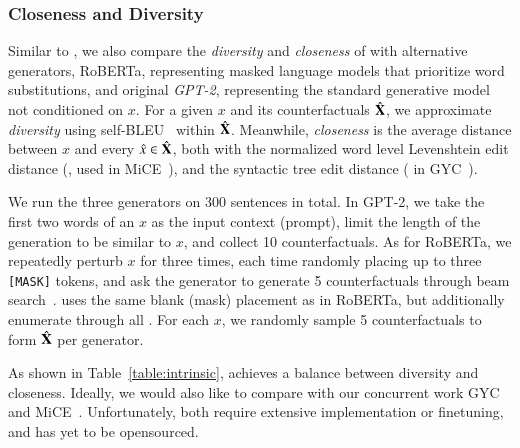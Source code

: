 \subsubsection{Closeness and Diversity}
Similar to \citet{madaan2020generate}, we also compare the \emph{diversity} and \emph{closeness} of \sysname with alternative generators, \ie RoBERTa, representing masked language models that prioritize word substitutions, and original \emph{GPT-2}, representing the standard generative model not conditioned on $x$. 
For a given $x$ and its counterfactuals $\hat{\mathbf{X}}$, we approximate \emph{diversity} using self-BLEU~\cite{zhu2018texygen} within $\hat{\mathbf{X}}$.
Meanwhile, \emph{closeness} is the average distance between $x$ and every $\hat{x} \in \hat{\mathbf{X}}$, both with the normalized word level Levenshtein edit distance (\cite{levenshtein1966binary}, used in MiCE~\cite{ross2020explaining}), and the syntactic tree edit distance (\cite{zhang1989simple} in GYC~\cite{madaan2020generate}).

We run the three generators on 300 sentences in total.
In GPT-2, we take the first two words of an $x$ as the input context (prompt), limit the length of the generation to be similar to $x$, and collect 10 counterfactuals.
As for RoBERTa, we repeatedly perturb $x$ for three times, each time randomly placing up to three \texttt{[MASK]} tokens, and ask the generator to generate 5 counterfactuals through beam search~\cite{checklist:acl20}.
\sysname uses the same blank (mask) placement as in RoBERTa, but additionally enumerate through all \tagstrs.
For each $x$, we randomly sample 5 counterfactuals to form $\hat{\mathbf{X}}$ per generator.

As shown in Table~\ref{table:intrinsic}, \sysname achieves a balance between diversity and closeness.
Ideally, we would also like to compare \sysname with our concurrent work GYC~\cite{madaan2020generate} and MiCE~\cite{ross2020explaining}.
Unfortunately, both require extensive implementation or finetuning, and has yet to be opensourced.



